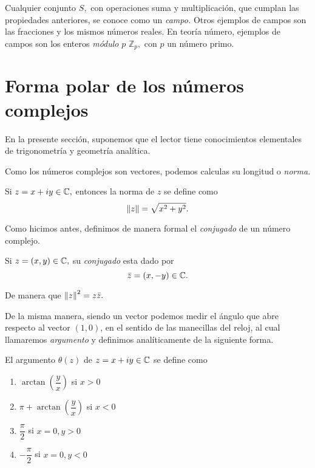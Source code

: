 \begin{observacion}
	Cualquier conjunto $S,$ con operaciones suma y multiplicación, que cumplan las propiedades anteriores, se conoce como
	un \emph{campo.} Otros ejemplos de campos son las fracciones y los mismos números reales. En teoría número, ejemplos de
	campos son los enteros \emph{módulo} $p$ $\mathbb{Z}_{p},$ con $p$ un número primo.
\end{observacion}

\section{Forma polar de los números complejos}

En la presente sección, suponemos que el lector tiene conocimientos elementales de trigonometría y geometría analítica. 

Como los números complejos son vectores, podemos calculas su longitud o \emph{norma.}

\begin{definicion}
	Si $z=x+iy\in \mathbb{C},$ entonces la norma de $z$ se define como
	$$
	\left\| z \right\|=\sqrt{x^{2}+y^{2}}.
	$$
\end{definicion}

Como hicimos antes, definimos de manera formal el \emph{conjugado} de un número complejo.
\begin{definicion}
	Si $z=(x,y)\in \mathbb{C},$ su \emph{conjugado} esta dado por
	$$
	\bar{z}=(x,-y)\in \mathbb{C}.
	$$
\end{definicion}

De manera que $\left\| z \right\|^{2}=z\bar{z}.$

De la misma manera, siendo un vector podemos medir el ángulo que abre respecto al vector $(1,0)$, en el sentido de las
manecillas del reloj, al cual llamaremos \emph{argumento} y definimos analíticamente de la siguiente forma.
\begin{definicion}
	El argumento $\theta(z)$ de $z=x+iy\in \mathbb{C}$ se define como
	\begin{enumerate}
		\item $\arctan\left( \dfrac{y}{x} \right)$ si $x>0$
		\item $\pi + \arctan\left( \dfrac{y}{x} \right)$ si $x<0$
		\item $\dfrac{\pi}{2}$ si $x=0, y> 0$
		\item $-\dfrac{\pi}{2}$ si $x=0, y< 0$
	\end{enumerate}
	
\end{definicion}

